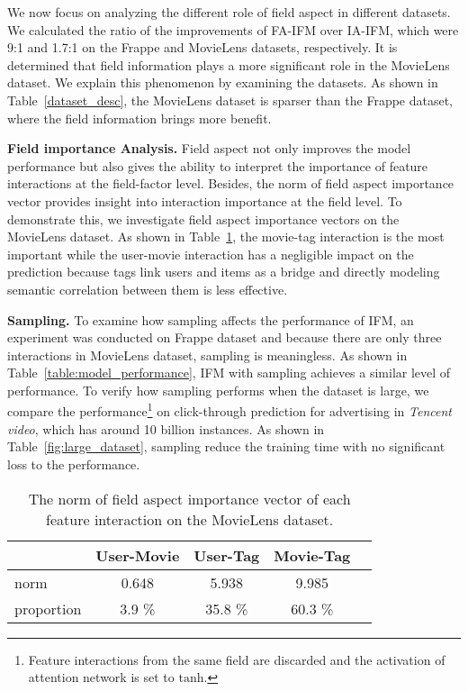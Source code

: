\documentclass[letterpaper]{article} \usepackage{aaai19}  \usepackage{times}  \usepackage{helvet}  \usepackage{courier}  \usepackage{url}  \usepackage{graphicx}  \frenchspacing  \setlength{\pdfpagewidth}{8.5in}  \setlength{\pdfpageheight}{11in}  \usepackage{mathtools}
\begin{document}
We now focus on analyzing the different role of field aspect in different datasets. 
We calculated the ratio of the improvements of FA-IFM over IA-IFM, which were 9:1 and 1.7:1 on the Frappe and MovieLens datasets, respectively.
It is determined that field information plays a more significant role in the MovieLens dataset. We explain this phenomenon by examining the datasets. As shown in Table~\ref{dataset_desc}, the MovieLens dataset is sparser than the Frappe dataset, where the field information brings more benefit\cite{juan2016field}.

\textbf{Field importance Analysis.} Field aspect not only improves the model performance but also gives the ability to interpret the importance of feature interactions at the field-factor level. Besides, the norm of field aspect importance vector provides insight into interaction importance at the field level. To demonstrate this, we investigate field aspect importance vectors on the MovieLens dataset. As shown in Table~\ref{table:field_analysis}, the movie-tag interaction is the most important while the user-movie interaction has a negligible impact on the prediction because tags link users and items as a bridge\cite{chen2016capturing} and directly modeling semantic correlation between them is less effective.

\textbf{Sampling.} To examine how sampling affects the performance of IFM, an experiment was conducted on Frappe dataset and because there are only three interactions in MovieLens dataset, sampling is meaningless. As shown in Table~\ref{table:model_performance}, IFM with sampling achieves a similar level of performance. 
To verify how sampling performs when the dataset is large, we compare the performance\footnote{Feature interactions from the same field are discarded and the activation of attention network is set to $\mathrm{tanh}$.} on click-through prediction for advertising in \emph{Tencent video}, which has around 10 billion instances. As shown in Table~\ref{fig:large_dataset}, sampling reduce the training time with no significant loss to the performance.

\begin{table}[t]
\caption{The norm of field aspect importance vector of each feature interaction on the MovieLens dataset.} \label{table:field_analysis}

\begin{center}
\begin{small} 
\begin{sc} 
\begin{tabular}{lcccr} 
\hline
 & User-Movie & User-Tag & Movie-Tag \\ 
\hline 
norm & 0.648 & 5.938 & 9.985 \\ 
proportion & 3.9 \% &  35.8 \% &  60.3 \% \\
\hline \end{tabular} \end{sc} \end{small} \end{center} \end{table} 
\end{document}

